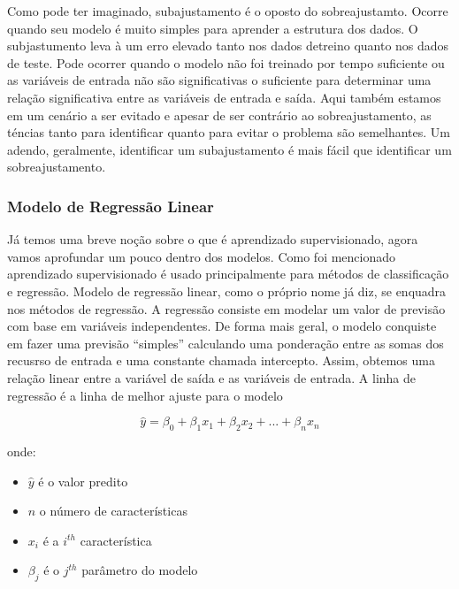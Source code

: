 \documentclass[
  letterpaper,
  DIV=11,
  numbers=noendperiod]{scrreprt}
\begin{document}
Como pode ter imaginado, subajustamento é o oposto do sobreajustamto.
Ocorre quando seu modelo é muito simples para aprender a estrutura dos
dados. O subjastumento leva à um erro elevado tanto nos dados detreino
quanto nos dados de teste. Pode ocorrer quando o modelo não foi treinado
por tempo suficiente ou as variáveis \hspace{0pt}\hspace{0pt}de entrada
não são significativas o suficiente para determinar uma relação
significativa entre as variáveis \hspace{0pt}\hspace{0pt}de entrada e
saída. Aqui também estamos em um cenário a ser evitado e apesar de ser
contrário ao sobreajustamento, as téncias tanto para identificar quanto
para evitar o problema são semelhantes. Um adendo, geralmente,
identificar um subajustamento é mais fácil que identificar um
sobreajustamento.

\hypertarget{modelo-de-regressuxe3o-linear}{%
\subsubsection{Modelo de Regressão
Linear}\label{modelo-de-regressuxe3o-linear}}

Já temos uma breve noção sobre o que é aprendizado supervisionado, agora
vamos aprofundar um pouco dentro dos modelos. Como foi mencionado
aprendizado supervisionado é usado principalmente para métodos de
classificação e regressão. Modelo de regressão linear, como o próprio
nome já diz, se enquadra nos métodos de regressão. A regressão consiste
em modelar um valor de previsão com base em variáveis independentes. De
forma mais geral, o modelo conquiste em fazer uma previsão ``simples''
calculando uma ponderação entre as somas dos recusrso de entrada e uma
constante chamada intercepto. Assim, obtemos uma relação linear entre a
variável de saída e as variáveis de entrada. A linha de regressão é a
linha de melhor ajuste para o modelo

\[
\hat y = \beta_0 + \beta_1x_1 + \beta_2x_2 + ...+ \beta_nx_n
\]

onde:

\begin{itemize}
\item
  \(\hat y\) é o valor predito
\item
  \(n\) o número de características
\item
  \(x_i\) é a \(i^{th}\) característica
\item
  \(\beta_j\) é o \(j^{th}\) parâmetro do modelo
\end{itemize}
\end{document}
